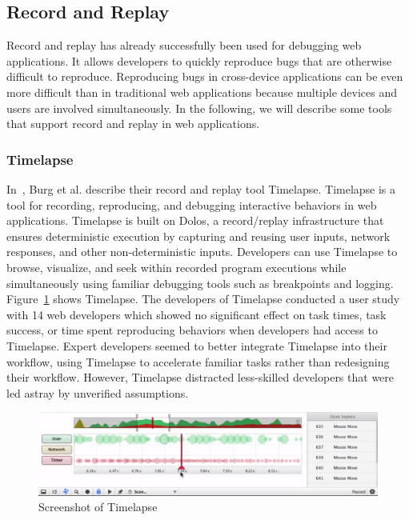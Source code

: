 \subsection{Record and Replay}

Record and replay has already successfully been used for debugging web applications. It allows developers to quickly reproduce bugs that are otherwise difficult to reproduce. Reproducing bugs in cross-device applications can be even more difficult than in traditional web applications because multiple devices and users are involved simultaneously. In the following, we will describe some tools that support record and replay in web applications.

\subsubsection{Timelapse}

In~\cite{timelapse2013}, Burg et al. describe their record and replay tool Timelapse. Timelapse is a tool for recording, reproducing, and debugging interactive behaviors in web applications. Timelapse is built on Dolos, a record/replay infrastructure that ensures deterministic execution by capturing and reusing user inputs, network responses, and other non-deterministic inputs. Developers can use Timelapse to browse, visualize, and seek within recorded program executions while simultaneously using familiar debugging tools such as breakpoints and logging. Figure~\ref{fig:timelapse} shows Timelapse. The developers of Timelapse conducted a user study with 14 web developers which showed no significant effect on task times, task success, or time spent reproducing behaviors when developers had access to Timelapse. Expert developers seemed to better integrate Timelapse into their workflow, using Timelapse to accelerate familiar tasks rather than redesigning their workflow. However, Timelapse distracted less-skilled developers that were led astray by unverified assumptions.

\begin{figure}[H]
  \centering
    \includegraphics[width=1.0\textwidth]{images/relatedwork/timelapse.png}
	\caption[Screenshot: Timelapse]{Screenshot of Timelapse}
	\label{fig:timelapse}
\end{figure}

